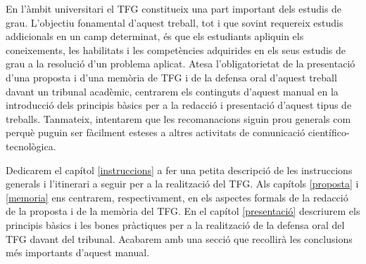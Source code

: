 En l'àmbit universitari el \acf{TFG} constitueix una part important dels estudis de grau. L'objectiu fonamental d'aquest treball, tot i que sovint requereix estudis addicionals en un camp determinat, és que els estudiants apliquin els coneixements, les habilitats i les competències adquirides en els seus estudis de grau a la resolució d'un problema aplicat. Atesa l'obligatorietat de la presentació d'una proposta i d'una memòria de \acf{TFG} i de la defensa oral d'aquest treball davant un tribunal acadèmic, centrarem els continguts d'aquest manual en la introducció dels principis bàsics per a la redacció i presentació d'aquest tipus de treballs. Tanmateix, intentarem que les recomanacions siguin prou generals com perquè puguin ser fàcilment esteses a altres activitats de comunicació científico-tecnològica.

Dedicarem el capítol \ref{instruccions} a fer una petita descripció de les instruccions generals i l'itinerari a seguir per a la realització del \ac{TFG}. Als capítols \ref{proposta} i \ref{memoria} ens centrarem, respectivament, en els aspectes formals de la redacció de la proposta i de la memòria del \ac{TFG}. En el capítol \ref{presentació} descriurem els principis bàsics i les bones pràctiques per a la realització de la defensa oral del \ac{TFG} davant del tribunal. Acabarem amb una secció que recollirà les conclusions més importants d'aquest manual.

